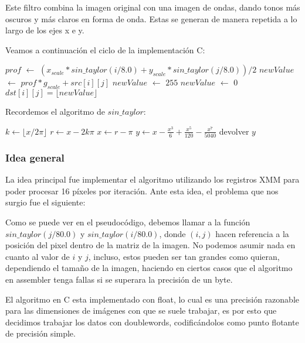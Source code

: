 Este filtro combina la imagen original con una imagen de ondas, dando tonos más oscuros y más claros en forma de onda. Estas se generan de manera repetida a lo largo de los ejes x e y.

Veamos a continuación el ciclo de la implementación C:

\begin{pseudocodigo}
      \STATE $prof$ $\leftarrow$ $(x_{scale} * sin\_taylor(i/8.0) + y_{scale} * sin\_taylor(j/8.0) )/2$ 
      \STATE $newValue$ $\leftarrow$ $prof * g_{scale} + src[i][j]$ 
        \STATE $newValue$ $\leftarrow$ $255$
      \ELSE 
          \STATE $newValue$ $\leftarrow$ $0$
        \ENDIF 
      \ENDIF
      \STATE $dst[i][j] = \lfloor newValue \rfloor$ 
    \ENDFOR
  \ENDFOR
\end{pseudocodigo}

Recordemos el algoritmo de $sin\_taylor$:

\begin{pseudocodigo}
  \STATE $k \leftarrow \lfloor x / 2\pi \rfloor$
  \STATE $r \leftarrow x - 2k\pi$
  \STATE $x \leftarrow r - \pi$
  \STATE $y \leftarrow x - \frac{x^3}{6} + \frac{x^5}{120} - \frac{x^7}{5040}$
  \STATE devolver $y$
\end{pseudocodigo}


\subsubsection{Idea general}

La idea principal fue implementar el algoritmo utilizando los registros XMM para poder procesar 16 píxeles por iteración. Ante esta idea, el problema que nos surgio fue el siguiente:

Como se puede ver en el pseudocódigo, debemos llamar a la función $sin\_taylor(j/80.0)$ y $sin\_taylor(i/80.0)$, donde $(i,j)$ hacen referencia a la posición del pixel dentro de la matriz de la imagen. No podemos asumir nada en cuanto al valor de $i$ y $j$, incluso, estos pueden ser tan grandes como quieran, dependiendo el tamaño de la imagen, haciendo en ciertos casos que el algoritmo en assembler tenga fallas si se superara la precisión de un byte. 

El algoritmo en C esta implementado con float, lo cual es una precisión razonable para las dimensiones de imágenes con que se suele trabajar, es por esto que decidimos trabajar los datos con doublewords, codificándolos como punto flotante de precisión simple.


